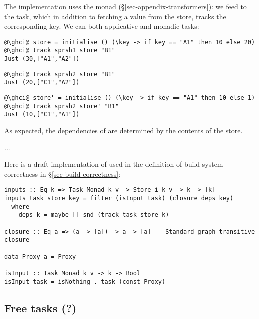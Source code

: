 The implementation uses the  monad (\S\ref{sec-appendix-transformers}):
we feed  to the task, which in
addition to fetching a value from the store, tracks the corresponding key. We
can  both applicative and monadic tasks:

\vspace{1mm}
\begin{verbatim}
@\ghci@ store = initialise () (\key -> if key == "A1" then 10 else 20)
@\ghci@ track sprsh1 store "B1"
Just (30,["A1","A2"])
\end{verbatim}
\vspace{1mm}
\begin{verbatim}
@\ghci@ track sprsh2 store "B1"
Just (20,["C1","A2"])
\end{verbatim}
\vspace{1mm}
\begin{verbatim}
@\ghci@ store' = initialise () (\key -> if key == "A1" then 10 else 1)
@\ghci@ track sprsh2 store' "B1"
Just (10,["C1","A1"])
\end{verbatim}
\vspace{1mm}

\noindent
As expected, the dependencies of  are determined by the contents of
the store.

...

Here is a draft implementation of  used in the definition of
build system correctness in \S\ref{sec-build-correctness}:

\begin{verbatim}
inputs :: Eq k => Task Monad k v -> Store i k v -> k -> [k]
inputs task store key = filter (isInput task) (closure deps key)
  where
    deps k = maybe [] snd (track task store k)

closure :: Eq a => (a -> [a]) -> a -> [a] -- Standard graph transitive closure

data Proxy a = Proxy

isInput :: Task Monad k v -> k -> Bool
isInput task = isNothing . task (const Proxy)
\end{verbatim}

\subsection{Free tasks (?)}


